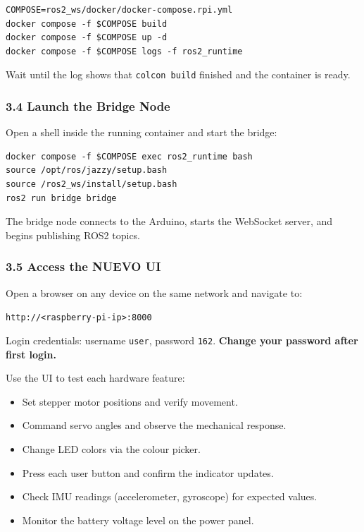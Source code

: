 \documentclass{ol-softwaremanual}
\begin{document}
\begin{verbatim}
COMPOSE=ros2_ws/docker/docker-compose.rpi.yml
docker compose -f $COMPOSE build
docker compose -f $COMPOSE up -d
docker compose -f $COMPOSE logs -f ros2_runtime
\end{verbatim}

Wait until the log shows that \texttt{colcon build} finished and the container is ready.

\subsubsection*{3.4 Launch the Bridge Node}

Open a shell inside the running container and start the bridge:

\begin{verbatim}
docker compose -f $COMPOSE exec ros2_runtime bash
source /opt/ros/jazzy/setup.bash
source /ros2_ws/install/setup.bash
ros2 run bridge bridge
\end{verbatim}

The bridge node connects to the Arduino, starts the WebSocket server, and begins
publishing ROS2 topics.

\subsubsection*{3.5 Access the NUEVO UI}

Open a browser on any device on the same network and navigate to:
\begin{center}
  \texttt{http://<raspberry-pi-ip>:8000}
\end{center}

Login credentials: username \texttt{user}, password \texttt{162}.
\textbf{Change your password after first login.}

Use the UI to test each hardware feature:
\begin{itemize}
  \item Set stepper motor positions and verify movement.
  \item Command servo angles and observe the mechanical response.
  \item Change LED colors via the colour picker.
  \item Press each user button and confirm the indicator updates.
  \item Check IMU readings (accelerometer, gyroscope) for expected values.
  \item Monitor the battery voltage level on the power panel.
\end{itemize}
\end{document}
